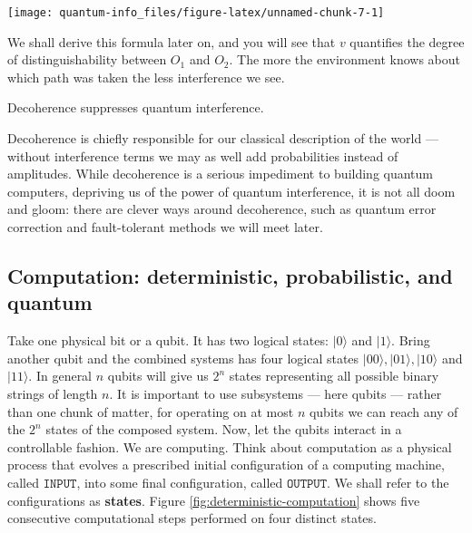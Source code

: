 \documentclass[fleqn]{article}
\newenvironment{idea}{\noindent}{\medskip}
\begin{document}
\begin{center}\texttt{[image: quantum-info\_files/figure-latex/unnamed-chunk-7-1]} \end{center}

We shall derive this formula later on, and you will see that \(v\) quantifies the degree of distinguishability between \(O_1\) and \(O_2\).
The more the environment knows about which path was taken the less interference we see.

\begin{idea}

Decoherence suppresses quantum interference.

\end{idea}

Decoherence is chiefly responsible for our classical description of the world --- without interference terms we may as well add probabilities instead of amplitudes.
While decoherence is a serious impediment to building quantum computers, depriving us of the power of quantum interference, it is not all doom and gloom: there are clever ways around decoherence, such as quantum error correction and fault-tolerant methods we will meet later.

\hypertarget{computation-deterministic-probabilistic-and-quantum}{%
\subsection{Computation: deterministic, probabilistic, and quantum}\label{computation-deterministic-probabilistic-and-quantum}}

Take one physical bit or a qubit.
It has two logical states: \(|0\rangle\) and \(|1\rangle\).
Bring another qubit and the combined systems has four logical states \(|00\rangle, |01\rangle,|10\rangle\) and \(|11\rangle\).
In general \(n\) qubits will give us \(2^n\) states representing all possible binary strings of length \(n\).
It is important to use subsystems --- here qubits --- rather than one chunk of matter, for operating on at most \(n\) qubits we can reach any of the \(2^n\) states of the composed system.
Now, let the qubits interact in a controllable fashion.
We are computing.
Think about computation as a physical process that evolves a prescribed initial configuration of a computing machine, called \textbf{\(\texttt{INPUT}\)}, into some final configuration, called \textbf{\(\texttt{OUTPUT}\)}.
We shall refer to the configurations as \textbf{states}.
Figure \ref{fig:deterministic-computation} shows five consecutive computational steps performed on four distinct states.
\end{document}
